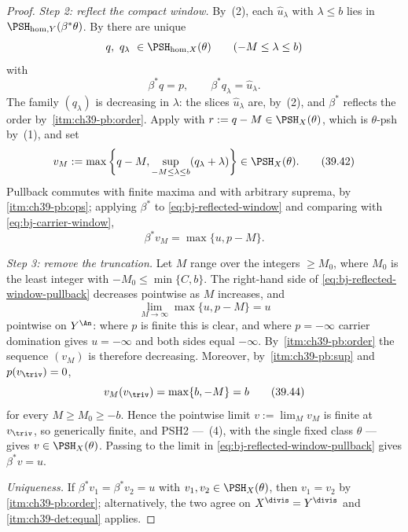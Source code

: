\begin{proof}
\medskip
\noindent\emph{Step 2: reflect the compact window.}
By \,(2), each
$\widehat u_\lambda$ with $\lambda\le b$ lies in
$\PSH_{\mathrm{hom},Y}(\beta^*\theta)$.  By
 there are unique
\[
                  q,\ q_\lambda\ \in
                  \PSH_{\mathrm{hom},X}(\theta)
                  \qquad(-M\le\lambda\le b)
\]
with
\[
                  \beta^*q=p,\qquad
                  \beta^*q_\lambda=\widehat u_\lambda .
\]
The family $(q_\lambda)$ is decreasing in $\lambda$: the slices
$\widehat u_\lambda$ are, by \,(2), and
$\beta^*$ reflects the order by
\,\cref{itm:ch39-pb:order}.  Apply
 with $r:=q-M\in\PSH_X(\theta)$,
which is $\theta$-psh by \,(1), and set
\[
 v_M:=\max\left\{q-M,
   \sup_{-M\le\lambda\le b}(q_\lambda+\lambda)\right\}
 \in\PSH_X(\theta).
\tag{39.42}\label{eq:bj-reflected-window}
\]
Pullback commutes with finite maxima and with arbitrary suprema, by
\,\cref{itm:ch39-pb:ops}; applying $\beta^*$ to
\eqref{eq:bj-reflected-window} and comparing with
\eqref{eq:bj-carrier-window},
\[
                         \beta^*v_M=\max\{u,p-M\}.
\tag{39.43}\label{eq:bj-reflected-window-pullback}
\]

\medskip
\noindent\emph{Step 3: remove the truncation.}
Let $M$ range over the integers $\ge M_0$, where $M_0$ is the least
integer with $-M_0\le\min\{C,b\}$.  The right-hand side of
\eqref{eq:bj-reflected-window-pullback} decreases pointwise as $M$
increases, and
\[
 \lim_{M\to\infty}\max\{u,p-M\}=u
\]
pointwise on $Y^{\An}$: where $p$ is finite this is clear, and where
$p=-\infty$ carrier domination gives $u=-\infty$ and both sides equal
$-\infty$.  By \,\cref{itm:ch39-pb:order} the
sequence $(v_M)$ is therefore decreasing.  Moreover, by
\,\cref{itm:ch39-pb:sup} and
$p(v_{\triv})=0$,
\[
                         v_M(v_{\triv})=\max\{b,-M\}=b
\tag{39.44}\label{eq:bj-reflected-trivial-value}
\]
for every $M\ge M_0\ge-b$.  Hence the pointwise limit
$v:=\lim_Mv_M$ is finite at $v_{\triv}$, so generically finite, and
PSH2 --- \,(4), with the single fixed class
$\theta$ --- gives $v\in\PSH_X(\theta)$.  Passing to the limit in
\eqref{eq:bj-reflected-window-pullback} gives $\beta^*v=u$.

\medskip
\noindent\emph{Uniqueness.}  If $\beta^*v_1=\beta^*v_2=u$ with
$v_1,v_2\in\PSH_X(\theta)$, then $v_1=v_2$ by
\,\cref{itm:ch39-pb:order}; alternatively, the two
agree on $X^{\divis}=Y^{\divis}$ and
\,\cref{itm:ch39-det:equal} applies.
\end{proof}

